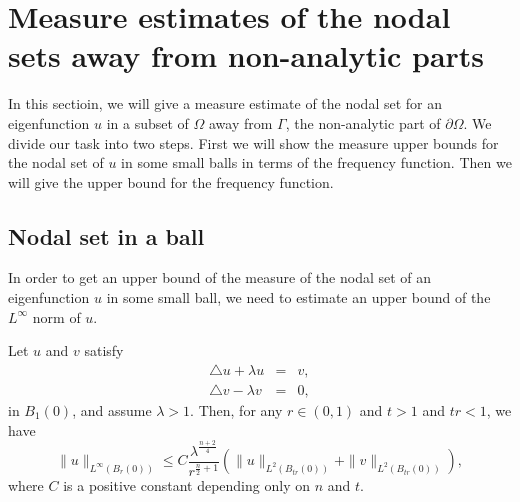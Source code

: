 \documentclass[a4paper, 12pt, onecolumn]{article} \textwidth 148mm
\begin{document}
\section{Measure estimates of the nodal sets away from non-analytic parts}

In this sectioin, we will give a measure estimate of the nodal set for an eigenfunction $u$ in a subset of $\Omega$ away from $\Gamma$, the non-analytic part of $\partial\Omega$. We divide our task into two steps. First we will show the measure upper bounds for the nodal set of $u$ in some small balls in terms of the frequency function. Then we will give the upper bound for the frequency function.
\subsection{Nodal set in a ball}

In order to get an upper bound of the measure of the nodal set of an eigenfunction $u$ in some small ball, we need to estimate an upper bound of the $L^{\infty}$ norm of $u$.



\begin{lemma}\label{upper bound for u}
Let $u$ and $v$ satisfy
\begin{eqnarray*}
\triangle u+\lambda u&=&v,\\
\triangle v-\lambda v&=&0,
\end{eqnarray*}
in $B_1(0)$, and assume $\lambda>1$. Then, for any $r\in(0,1)$ and $t>1$ and $tr<1$, we have
\begin{equation}
\|u\|_{L^{\infty}(B_r(0))}\leq
C\frac{\lambda^{\frac{n+2}{4}}}{r^{\frac{n}{2}+1}}(\|u\|_{L^2(B_{tr}(0))}+\|v\|_{L^2(B_{tr}(0))}),
\end{equation}
where $C$ is a positive constant depending only on $n$ and $t$.
\end{lemma}
\end{document}
